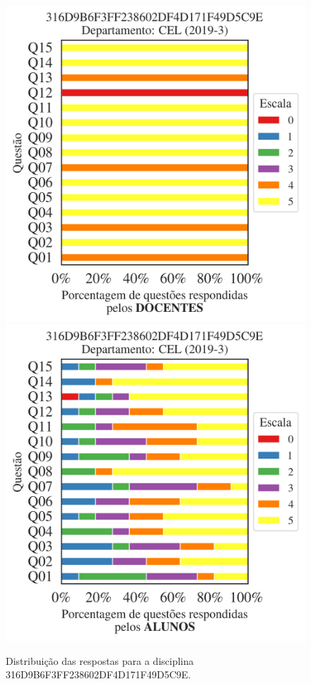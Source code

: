 \documentclass[a4paper,10pt]{article}
\begin{document}
\begin{figure}[h]
\centering
\includegraphics[width=0.485\linewidth]{analise_disciplina_departamento_CEL_316D9B6F3FF238602DF4D171F49D5C9E_docentes.png}
\includegraphics[width=0.485\linewidth]{analise_disciplina_departamento_CEL_316D9B6F3FF238602DF4D171F49D5C9E_alunos.png}
\caption{\label{fig:analise_geral_departamento}                Distribuição das respostas para a disciplina 316D9B6F3FF238602DF4D171F49D5C9E. }
\end{figure}
\end{document}
